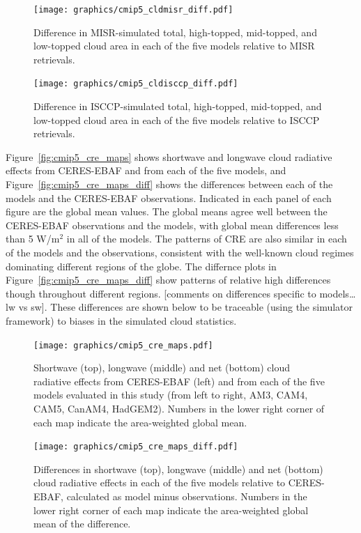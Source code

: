 \begin{figure}[htbp]
\centering
\texttt{[image: graphics/cmip5\_cldmisr\_diff.pdf]}
\caption{\label{fig:cmip5_cldmisr_maps_diff}Difference in MISR-simulated
total, high-topped, mid-topped, and low-topped cloud area in each of the
five models relative to MISR
retrievals.}\label{fig:cmip5ux5fcldmisrux5fmapsux5fdiff}
\end{figure}

\begin{figure}[htbp]
\centering
\texttt{[image: graphics/cmip5\_cldisccp\_diff.pdf]}
\caption{\label{fig:cmip5_cldisccp_maps_diff}Difference in
ISCCP-simulated total, high-topped, mid-topped, and low-topped cloud
area in each of the five models relative to ISCCP
retrievals.}\label{fig:cmip5ux5fcldisccpux5fmapsux5fdiff}
\end{figure}

Figure~\ref{fig:cmip5_cre_maps} shows shortwave and longwave cloud
radiative effects from CERES-EBAF and from each of the five models, and
Figure~\ref{fig:cmip5_cre_maps_diff} shows the differences between each
of the models and the CERES-EBAF observations. Indicated in each panel
of each figure are the global mean values. The global means agree well
between the CERES-EBAF observations and the models, with global mean
differences less than 5 W/m\(^2\) in all of the models. The patterns of
CRE are also similar in each of the models and the observations,
consistent with the well-known cloud regimes dominating different
regions of the globe. The differnce plots in
Figure~\ref{fig:cmip5_cre_maps_diff} show patterns of relative high
differences though throughout different regions. {[}comments on
differences specific to models\ldots{}lw vs sw{]}. These differences are
shown below to be traceable (using the simulator framework) to biases in
the simulated cloud statistics.

\begin{figure}[htbp]
\centering
\texttt{[image: graphics/cmip5\_cre\_maps.pdf]}
\caption{\label{fig:cmip5_cre_maps}Shortwave (top), longwave (middle)
and net (bottom) cloud radiative effects from CERES-EBAF (left) and from
each of the five models evaluated in this study (from left to right,
AM3, CAM4, CAM5, CanAM4, HadGEM2). Numbers in the lower right corner of
each map indicate the area-weighted global
mean.}\label{fig:cmip5ux5fcreux5fmaps}
\end{figure}

\begin{figure}[htbp]
\centering
\texttt{[image: graphics/cmip5\_cre\_maps\_diff.pdf]}
\caption{\label{fig:cmip5_cre_maps_diff}Differences in shortwave (top),
longwave (middle) and net (bottom) cloud radiative effects in each of
the five models relative to CERES-EBAF, calculated as model minus
observations. Numbers in the lower right corner of each map indicate the
area-weighted global mean of the
difference.}\label{fig:cmip5ux5fcreux5fmapsux5fdiff}
\end{figure}


